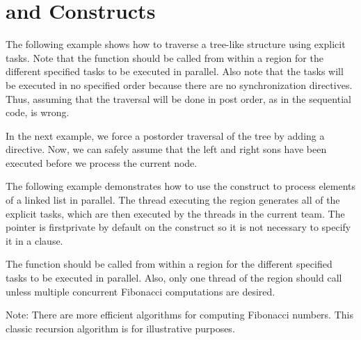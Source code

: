 \pagebreak
\section{ and  Constructs}
\label{sec:task_taskwait}

The following example shows how to traverse a tree-like structure using explicit 
tasks. Note that the  function should be called from within a 
 region for the different specified tasks to be executed in parallel. Also 
note that the tasks will be executed in no specified order because there are no 
synchronization directives. Thus, assuming that the traversal will be done in post 
order, as in the sequential code, is wrong.



In the next example, we force a postorder traversal of the tree by adding a  
directive. Now, we can safely assume that the left and right sons have been executed 
before we process the current node.



The following example demonstrates how to use the  construct to process 
elements of a linked list in parallel. The thread executing the  
region generates all of the explicit tasks, which are then executed by the threads 
in the current team. The pointer  is firstprivate by default 
on the  construct so it is not necessary to specify it in a  
clause.
%



The  function should be called from within a  region 
for the different specified tasks to be executed in parallel. Also, only one thread 
of the  region should call  unless multiple concurrent 
Fibonacci computations are desired. 


\clearpage

Note: There are more efficient algorithms for computing Fibonacci numbers. This 
classic recursion algorithm is for illustrative purposes.

